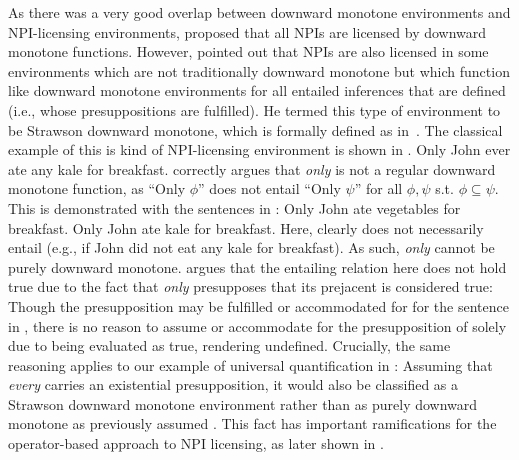 \xe
As there was a very good overlap between downward monotone environments and NPI-licensing environments, \textcite{Ladusaw1980} proposed that all NPIs are licensed by downward monotone functions. However, \textcite{Fintel1999} pointed out that NPIs are also licensed in some environments which are not traditionally downward monotone but which function like downward monotone environments for all entailed inferences that are defined (i.e., whose presuppositions are fulfilled). He termed this type of environment to be Strawson downward monotone, which is formally defined as in~.
\ex{}\label{def:sdm}%
%
\xe
The classical example of this is kind of NPI-licensing environment is shown in .
\ex{}
Only John ever ate any kale for breakfast.\hfill\parencite[p.~101]{Fintel1999}
\xe
\textcite{Fintel1999} correctly argues that \textit{only} is not a regular downward monotone function, as \enquote{Only $\phi$} does not entail \enquote{Only $\psi$} for all $\phi,\psi$ s.t. $\phi\subseteq\psi$. This is demonstrated with the sentences in :
\pex[nopreamble=true]\label{ex:only-dm}%
\a{} Only John ate vegetables for breakfast.
\a{} Only John ate kale for breakfast.
\xe
Here,  clearly does not necessarily entail  (e.g., if John did not eat any kale for breakfast). As such, \textit{only} cannot be purely downward monotone. \textcite{Fintel1999} argues that the entailing relation here does not hold true due to the fact that \textit{only} presupposes that its prejacent is considered true: Though the presupposition may be fulfilled or accommodated for for the sentence in , there is no reason to assume or accommodate for the presupposition of  solely due to  being evaluated as true, rendering  undefined. Crucially, the same reasoning applies to our example of universal quantification in : Assuming that \textit{every} carries an existential presupposition, it would also be classified as a Strawson downward monotone environment \parencite{Fintel1999} rather than as purely downward monotone as previously assumed \parencite{Fauconnier1975a,Fauconnier1975b,Ladusaw1980}. This fact has important ramifications for the operator-based approach to NPI licensing, as later shown in .



